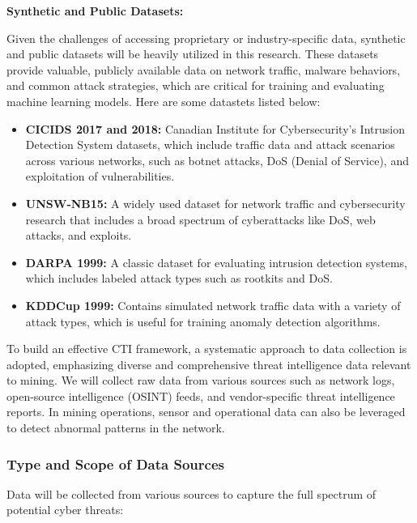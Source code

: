\documentclass[a4paper,twoside,12pt]{report}
\begin{document}
\textbf{Synthetic and Public Datasets:} 

Given the challenges of accessing proprietary or industry-specific data, synthetic and public datasets will be heavily utilized in this research. These datasets provide valuable, publicly available data on network traffic, malware behaviors, and common attack strategies, which are critical for training and evaluating machine learning models. Here are some datastets listed below:
\begin{itemize}
    \item \textbf{CICIDS 2017 and 2018:} Canadian Institute for Cybersecurity's Intrusion Detection System datasets, which include traffic data and attack scenarios across various networks, such as botnet attacks, DoS (Denial of Service), and exploitation of vulnerabilities.
    \item \textbf{UNSW-NB15:} A widely used dataset for network traffic and cybersecurity research that includes a broad spectrum of cyberattacks like DoS, web attacks, and exploits.
    \item \textbf{DARPA 1999:} A classic dataset for evaluating intrusion detection systems, which includes labeled attack types such as rootkits and DoS.
    \item \textbf{KDDCup 1999:} Contains simulated network traffic data with a variety of attack types, which is useful for training anomaly detection algorithms.
\end{itemize}
To build an effective CTI framework, a systematic approach to data collection is adopted, emphasizing diverse and comprehensive threat intelligence data relevant to mining. We will collect raw data from various sources such as network logs, open-source intelligence (OSINT) feeds, and vendor-specific threat intelligence reports. In mining operations, sensor and operational data can also be leveraged to detect abnormal patterns in the network.

\subsubsection{Type and Scope of Data Sources}

Data will be collected from various sources to capture the full spectrum of potential cyber threats:
\end{document}
